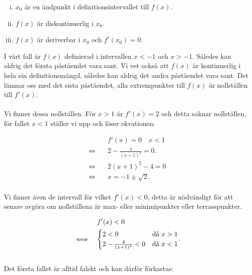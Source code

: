 \documentclass{article}
\begin{document}
\begin{enumerate}[i)]
        \item $x_{0}$ är en ändpunkt i definitionsintervallet till $f(x)$.
        \item $f(x)$ är diskontinuerlig i $x_{0}$.
        \item $f(x)$ är deriverbar i $x_{0}$ och $f'(x_{0}) = 0$.
\end{enumerate}

\noindent I vårt fall är $f(x)$ definierad i intervallen $x < -1$ och $x > -1$. Således kan aldrig det första påståendet vara sant. Vi vet också att $f(x)$ är kontinuerlig i hela sin definitionsmängd, således kan aldrig det andra påståendet vara sant. Det lämnar oss med det sista påståendet, alla extrempunkter till $f(x)$ är nollställen till $f'(x)$.
\\
\\
Vi finner dessa nollställen. För $x > 1$ är $f'(x) = 2$ och detta saknar nollställen, för fallet $x < 1$ ställer vi upp och löser ekvationen:

\begin{align*}
  & f'(x) = 0 \quad x < 1 \\
  \iff \quad & 2 - \frac{4}{(x + 1)^{2}} = 0 \text{.} \\
  \iff \quad & 2(x + 1)^{2} - 4 = 0 \\
  \iff \quad & x = -1 \pm \sqrt{2}\text{.}
\end{align*}
\\
Vi finner även de intervall för vilket $f'(x) < 0$, detta är nödvändigt för att senare avgöra om nollställena är max- eller minimipunkter eller terrasspunkter.

\begin{align}
  & f'(x) < 0 \notag \\
  \iff \quad &
  \begin{aligned}
    \begin{cases}
      2 < 0 & \text{då} \; x > 1 \\
      2 - \frac{4}{(x+1)^{2}} < 0 & \text{då} \; x < 1
    \end{cases}
  \end{aligned}\text{.} \label{fp_cases}
\end{align}
\\
Det första fallet är alltid falskt och kan därför förkastas:
\end{document}
